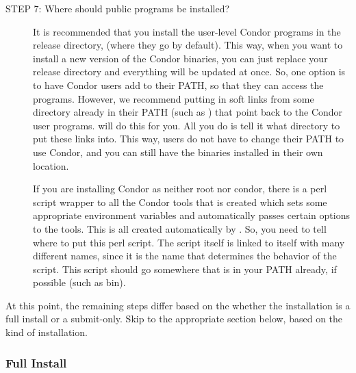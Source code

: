 \begin{description}
\item[STEP 7: Where should public programs be installed?]

     It is recommended that you install the user-level Condor programs
     in the release directory, (where they go by default).  This way,
     when you want to install a new version of the Condor binaries,
     you can just replace your release directory and everything will
     be updated at once.  So, one option is to have Condor users add
      to their PATH, so that they can access the
     programs.  However, we recommend putting in soft links from some
     directory already in their PATH (such as ) that
     point back to the Condor user programs.   will do
     this for you. All you do is tell it what directory to put
     these links into.  This way, users do not have to change their
     PATH to use Condor, and you can still have the binaries installed
     in their own location.

     If you are installing Condor as neither root nor condor, there is
     a perl script wrapper to all the Condor tools that is created
     which sets some appropriate environment variables and
     automatically passes certain options to the tools.  This is all
     created automatically by .  So, you need to tell
      where to put this perl script.  The script itself
     is linked to itself with many different names, since it is the
     name that determines the behavior of the script.  This script
     should go somewhere that is in your PATH already, if possible
     (such as \Tilde bin).

\end{description}

At this point, the remaining steps differ based on the
whether the installation is a full install or a submit-only.
Skip to the appropriate section below, based on the kind of installation.

\subsubsection{Full Install}

